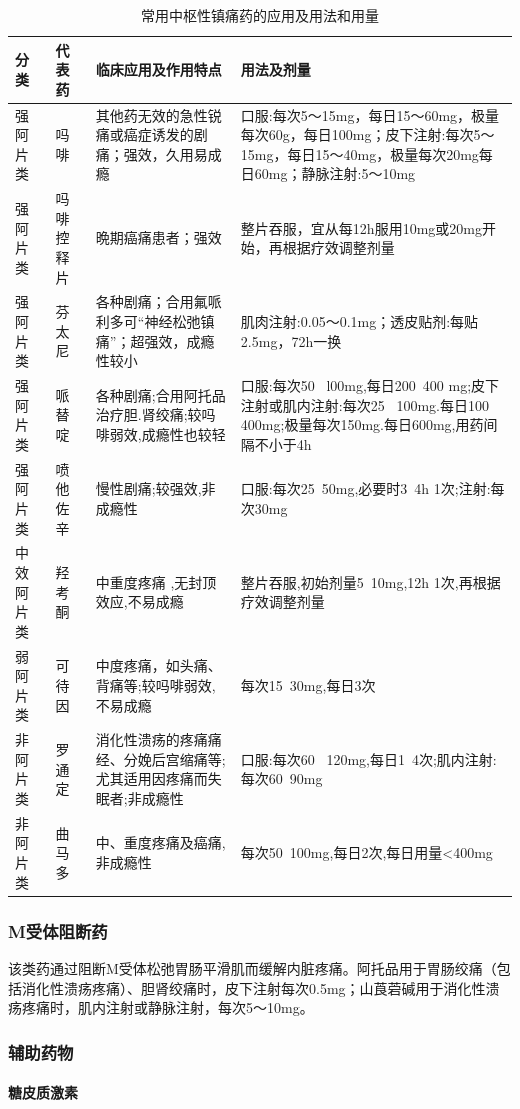 \begin{longtable}[]{llp{5cm}p{5cm}}
    \caption{常用中枢性镇痛药的应用及用法和用量}
    \label{tab20-3}\\
\toprule
分类&代表药&临床应用及作用特点&用法及剂量\\
\midrule
\endhead
强阿片类&吗啡&其他药无效的急性锐痛或癌症诱发的剧痛；强效，久用易成瘾&口服:每次5～15mg，每日15～60mg，极量每次60g，每日100mg；皮下注射:每次5～15mg，每日15～40mg，极量每次20mg每日60mg；静脉注射:5～10mg\\
强阿片类&吗啡控释片&晩期癌痛患者；强效&整片吞服，宜从每12h服用10mg或20mg开始，再根据疗效调整剂量\\
强阿片类&芬太尼&各种剧痛；合用氟哌利多可“神经松弛镇痛”；超强效，成瘾性较小&肌肉注射:0.05～0.1mg；透皮贴剂:每贴2.5mg，72h一换\\
强阿片类&哌替啶&各种剧痛;合用阿托品治疗胆.肾绞痛;较吗啡弱效,成瘾性也较轻 &口服:每次50~ l00mg,每日200~400 mg;皮下注射或肌内注射:每次25~ 100mg.每日100~ 400mg;极量每次150mg.每日600mg,用药间隔不小于4h\\
强阿片类 &喷他佐辛&慢性剧痛;较强效,非成瘾性& 口服:每次25~50mg,必要时3~4h 1次;注射:每次30mg\\
中效阿片类& 羟考酮&中重度疼痛 ,无封顶效应,不易成瘾&整片吞服,初始剂量5~10mg,12h 1次,再根据疗效调整剂量\\
弱阿片类  &可待因&中度疼痛，如头痛、背痛等;较吗啡弱效,不易成瘾&每次15~30mg,每日3次\\
非阿片类 & 罗通定&消化性溃疡的疼痛痛经、分娩后宫缩痛等;尤其适用因疼痛而失眠者;非成瘾性&口服:每次60~ 120mg,每日1~4次;肌内注射:每次60~90mg\\
非阿片类 &曲马多& 中、重度疼痛及癌痛,非成瘾性&每次50~100mg,每日2次,每日用量<400mg\\
\bottomrule
\end{longtable}


\subsubsection{M受体阻断药}

该类药通过阻断M受体松弛胃肠平滑肌而缓解内脏疼痛。阿托品用于胃肠绞痛（包括消化性溃疡疼痛）、胆肾绞痛时，皮下注射每次0.5mg；山莨菪碱用于消化性溃疡疼痛时，肌内注射或静脉注射，每次5～10mg。

\subsubsection{辅助药物}
\paragraph{糖皮质激素}


